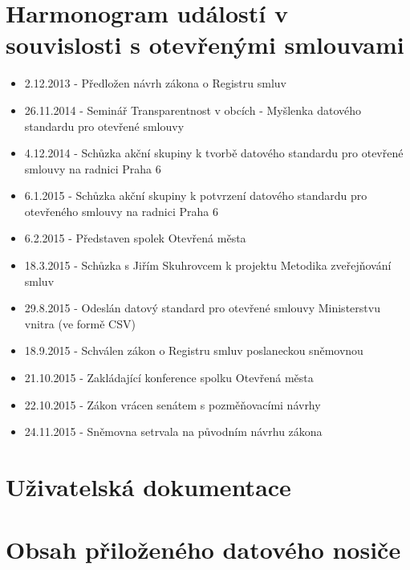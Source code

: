 
\section*{Harmonogram událostí v souvislosti s otevřenými smlouvami}

\begin{itemize}
\item[] 2.12.2013 - Předložen návrh zákona o Registru smluv
\item[] 26.11.2014 - Seminář Transparentnost v obcích - Myšlenka datového standardu pro otevřené smlouvy
\item[] 4.12.2014 - Schůzka akční skupiny k tvorbě datového standardu pro otevřené smlouvy na radnici Praha 6
\item[] 6.1.2015 - Schůzka akční skupiny k potvrzení datového standardu pro otevřeného smlouvy na radnici Praha 6
\item[] 6.2.2015 - Představen spolek Otevřená města
\item[] 18.3.2015 - Schůzka s Jiřím Skuhrovcem k projektu Metodika zveřejňování smluv
\item[] 29.8.2015 - Odeslán datový standard pro otevřené smlouvy Ministerstvu vnitra (ve formě CSV)
\item[] 18.9.2015 - Schválen zákon o Registru smluv poslaneckou sněmovnou 
\item[] 21.10.2015 - Zakládající konference spolku Otevřená města 
\item[] 22.10.2015 - Zákon vrácen senátem s pozměňovacími návrhy 
\item[] 24.11.2015 - Sněmovna setrvala na původním návrhu zákona
\end{itemize}


\section*{Uživatelská dokumentace}


\section*{Obsah přiloženého datového nosiče}






